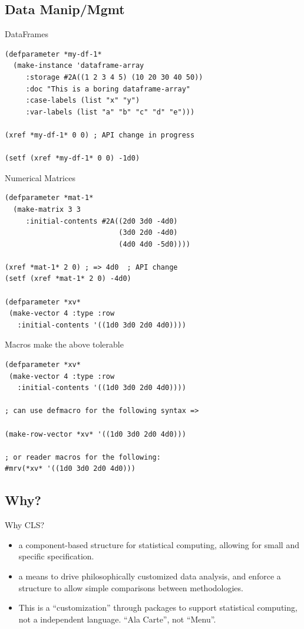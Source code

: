 \documentclass{beamer}
\begin{document}
\subsection{Data Manip/Mgmt}
\label{sec:work:data}

\begin{frame}[fragile]{DataFrames}
\small{
\begin{verbatim}
(defparameter *my-df-1*
  (make-instance 'dataframe-array
	 :storage #2A((1 2 3 4 5) (10 20 30 40 50))
	 :doc "This is a boring dataframe-array"
	 :case-labels (list "x" "y")
	 :var-labels (list "a" "b" "c" "d" "e")))

(xref *my-df-1* 0 0) ; API change in progress

(setf (xref *my-df-1* 0 0) -1d0)
\end{verbatim}
}
\end{frame}

\begin{frame}[fragile]{Numerical Matrices}
\small{
\begin{verbatim}
(defparameter *mat-1*
  (make-matrix 3 3
     :initial-contents #2A((2d0 3d0 -4d0)
                           (3d0 2d0 -4d0)
                           (4d0 4d0 -5d0))))

(xref *mat-1* 2 0) ; => 4d0  ; API change
(setf (xref *mat-1* 2 0) -4d0) 

(defparameter *xv*
 (make-vector 4 :type :row 
   :initial-contents '((1d0 3d0 2d0 4d0))))
\end{verbatim}
}
\end{frame}

\begin{frame}[fragile]{Macros make the above tolerable}
\begin{verbatim}
(defparameter *xv*
 (make-vector 4 :type :row 
   :initial-contents '((1d0 3d0 2d0 4d0))))

; can use defmacro for the following syntax =>

(make-row-vector *xv* '((1d0 3d0 2d0 4d0)))

; or reader macros for the following:
#mrv(*xv* '((1d0 3d0 2d0 4d0)))
\end{verbatim}
\end{frame}

\subsection{Why?}

\begin{frame}{Why CLS?}
  \begin{itemize}
  \item a component-based structure for statistical computing,
    allowing for small and specific specification.
  \item a means to drive philosophically customized data analysis, and
    enforce a structure to allow simple comparisons between
    methodologies.
  \item This is a ``customization'' through packages to support
    statistical computing, not a independent language.  ``Ala Carte'',
    not ``Menu''.
  \end{itemize}
\end{frame}
\end{document}
